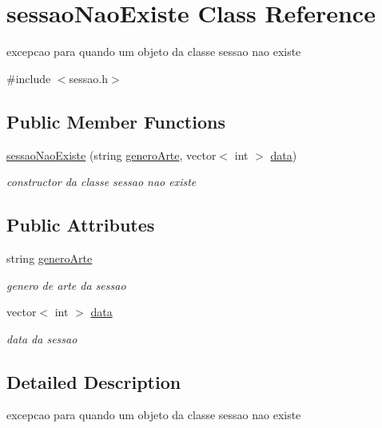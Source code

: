 \hypertarget{classsessaoNaoExiste}{}\section{sessao\+Nao\+Existe Class Reference}
\label{classsessaoNaoExiste}


excepcao para quando um objeto da classe sessao nao existe  




{\ttfamily \#include $<$sessao.\+h$>$}

\subsection*{Public Member Functions}
\begin{DoxyCompactItemize}
\item 
\hyperlink{classsessaoNaoExiste_a99b5467c84c7a4725263266a7e9e3f16}{sessao\+Nao\+Existe} (string \hyperlink{classsessaoNaoExiste_a9f8ff344f3b530037e6f35ba6103b29a}{genero\+Arte}, vector$<$ int $>$ \hyperlink{classsessaoNaoExiste_a3655c1214a1183e518bb090f128ee025}{data})
\begin{DoxyCompactList}\small\item\em constructor da classe sessao nao existe \end{DoxyCompactList}\end{DoxyCompactItemize}
\subsection*{Public Attributes}
\begin{DoxyCompactItemize}
\item 
string \hyperlink{classsessaoNaoExiste_a9f8ff344f3b530037e6f35ba6103b29a}{genero\+Arte}
\begin{DoxyCompactList}\small\item\em genero de arte da sessao \end{DoxyCompactList}\item 
vector$<$ int $>$ \hyperlink{classsessaoNaoExiste_a3655c1214a1183e518bb090f128ee025}{data}
\begin{DoxyCompactList}\small\item\em data da sessao \end{DoxyCompactList}\end{DoxyCompactItemize}


\subsection{Detailed Description}
excepcao para quando um objeto da classe sessao nao existe 

